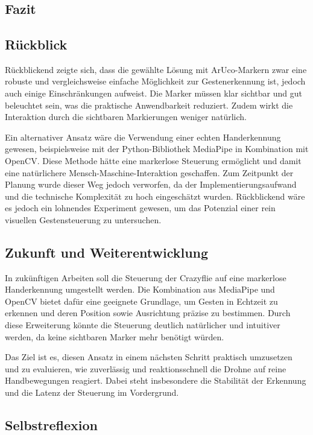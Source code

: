 \chapter{\chapFive}
\label{cha:chapter5} %

\begingroup
\fontsize{12pt}{14pt}\selectfont

\section{Fazit}

\section{Rückblick}

Rückblickend zeigte sich, dass die gewählte Lösung mit ArUco-Markern zwar eine robuste und vergleichsweise einfache Möglichkeit zur Gestenerkennung ist, jedoch auch einige Einschränkungen aufweist.
Die Marker müssen klar sichtbar und gut beleuchtet sein, was die praktische Anwendbarkeit reduziert.
Zudem wirkt die Interaktion durch die sichtbaren Markierungen weniger natürlich.

Ein alternativer Ansatz wäre die Verwendung einer echten Handerkennung gewesen, beispielsweise mit der Python-Bibliothek MediaPipe in Kombination mit OpenCV.
Diese Methode hätte eine markerlose Steuerung ermöglicht und damit eine natürlichere Mensch-Maschine-Interaktion geschaffen.
Zum Zeitpunkt der Planung wurde dieser Weg jedoch verworfen, da der Implementierungsaufwand und die technische Komplexität zu hoch eingeschätzt wurden.
Rückblickend wäre es jedoch ein lohnendes Experiment gewesen, um das Potenzial einer rein visuellen Gestensteuerung zu untersuchen.

\section{Zukunft und Weiterentwicklung}

In zukünftigen Arbeiten soll die Steuerung der Crazyflie auf eine markerlose Handerkennung umgestellt werden.
Die Kombination aus MediaPipe und OpenCV bietet dafür eine geeignete Grundlage, um Gesten in Echtzeit zu erkennen und deren Position sowie Ausrichtung präzise zu bestimmen.
Durch diese Erweiterung könnte die Steuerung deutlich natürlicher und intuitiver werden, da keine sichtbaren Marker mehr benötigt würden.

Das Ziel ist es, diesen Ansatz in einem nächsten Schritt praktisch umzusetzen und zu evaluieren, wie zuverlässig und reaktionsschnell die Drohne auf reine Handbewegungen reagiert.
Dabei steht insbesondere die Stabilität der Erkennung und die Latenz der Steuerung im Vordergrund.

\section{Selbstreflexion}

\endgroup